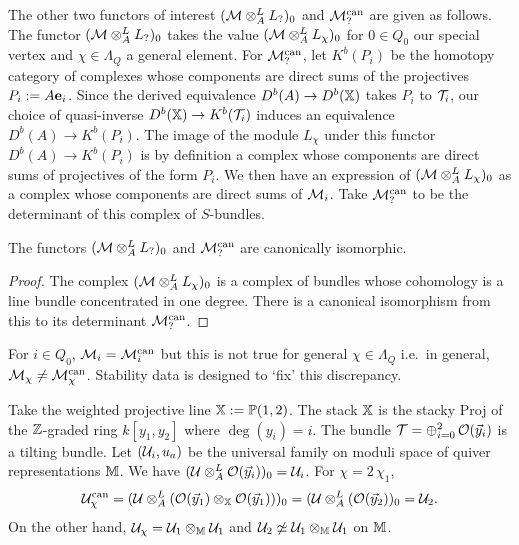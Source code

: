 \documentclass[12pt]{amsart}
\begin{document}
The other two functors of interest $(\mathcal{M} \otimes_A^L L_?)_0$ and $\mathcal{M}_?^{\text{can}}$ are given as follows.
The functor $(\mathcal{M} \otimes_A^L L_?)_0$ takes the value  $(\mathcal{M} \otimes_A^L L_\chi)_0$ for $0 \in Q_0$ our special vertex and $\chi \in \Lambda_Q$ a general element.
For $\mathcal{M}_?^{\text{can}}$, let $K^b(P_i)$ be the homotopy category of complexes whose components are direct sums of the projectives $P_i := A\mathbf{e}_i$. Since the derived equivalence $D^b(A) \rightarrow D^b(\mathbb{X})$ takes $P_i$ to $\mathcal{T}_i$, our choice of quasi-inverse $D^b(\mathbb{X}) \rightarrow K^b(\mathcal{T}_i)$ induces an equivalence $D^b(A) \rightarrow K^b(P_i)$. 
The image of the module $L_\chi$ under this functor $D^b(A) \rightarrow K^b(P_i)$ is by definition a complex whose components are direct sums of projectives of the form $P_i$.
We then have an expression of $(\mathcal{M} \otimes_A^L L_\chi)_0$ as a complex whose components are direct sums of $\mathcal{M}_i$.
Take $\mathcal{M}_?^{\text{can}}$ to be the determinant of this complex of $S$-bundles.

\begin{lemma}\label{lm:Mcan}
The functors $(\mathcal{M} \otimes_A^L L_?)_0$ and $\mathcal{M}_?^{\textup{can}}$ are canonically isomorphic.
\end{lemma}

\begin{proof}
The complex $(\mathcal{M} \otimes_A^L L_\chi)_0$ is a complex of bundles whose cohomology is a line bundle concentrated in one degree. 
There is a canonical isomorphism from this to its determinant $\mathcal{M}_?^{\text{can}}$.
\end{proof}

For $i \in Q_0$, $\mathcal{M}_i= \mathcal{M}_i^\text{can}$ but this is not true for general $\chi \in \Lambda_Q$ i.e.\ in general, $\mathcal{M}_\chi \neq \mathcal{M}_\chi^\text{can}$.
Stability data is designed to `fix' this discrepancy.

\begin{example}
Take the weighted projective line $\mathbb{X}:=\mathbb{P}(1,2)$. 
The stack $\mathbb{X}$ is the stacky Proj of the $\mathbb{Z}$-graded ring $k[y_1,y_2]$ where $\deg(y_i)=i$.
The bundle $\mathcal{T}= \oplus_{i=0}^2 \,\mathcal{O}({\vec{y}}_i)$ is a tilting bundle.
Let $(\mathcal{U}_i, u_a)$ be the universal family on moduli space of quiver representations $\mathbb{M}$.
We have $(\mathcal{U} \otimes_A^L \mathcal{O}({\vec{y}}_i))_0 = \mathcal{U}_i$.
For $\chi= 2\,\chi_1$, $$\mathcal{U}_\chi^\text{can} = (\mathcal{U} \otimes_A^L (\mathcal{O}({\vec{y}}_1)\otimes_{\mathbb{X}} \mathcal{O}({\vec{y}}_1)))_0 = (\mathcal{U} \otimes_A^L (\mathcal{O}({\vec{y}}_2))_0 = \mathcal{U}_2.$$
On the other hand, $\mathcal{U}_\chi = \mathcal{U}_1 \otimes_{\mathbb{M}} \mathcal{U}_1$ and $\mathcal{U}_2 \not\simeq \mathcal{U}_1 \otimes_{\mathbb{M}} \mathcal{U}_1$ on $\mathbb{M}$.
\end{example}
\end{document}
